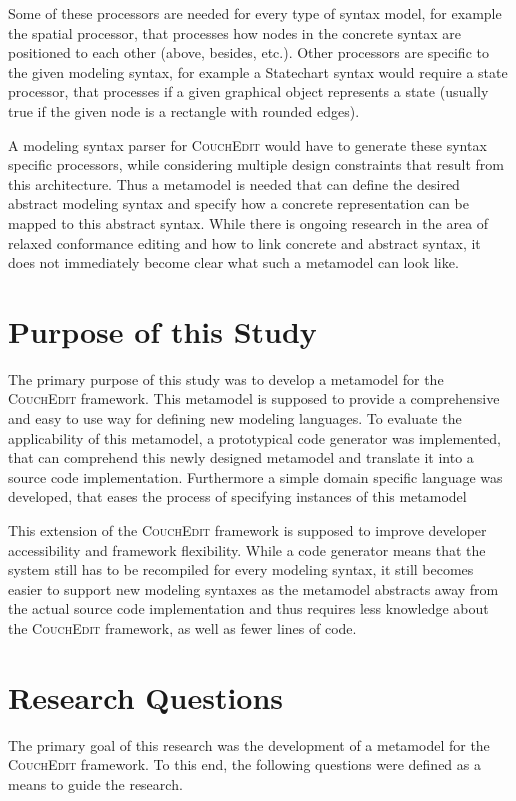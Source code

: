 Some of these processors are needed for every type of syntax model, for example the spatial processor, that processes how nodes in the concrete syntax are positioned to each other (above, besides, etc.). Other processors are specific to the given modeling syntax, for example a Statechart syntax would require a state processor, that processes if a given graphical object represents a state (usually true if the given node is a rectangle with rounded edges).

A modeling syntax parser for \textsc{CouchEdit} would have to generate these syntax specific processors, while considering multiple design constraints that result from this architecture. Thus a metamodel is needed that can define the desired abstract modeling syntax and specify how a concrete representation can be mapped to this abstract syntax. While there is ongoing research in the area of relaxed conformance editing and how to link concrete and abstract syntax, it does not immediately become clear what such a metamodel can look like.

\section{Purpose of this Study}
The primary purpose of this study was to develop a metamodel for the \textsc{CouchEdit} framework. This metamodel is supposed to provide a comprehensive and easy to use way for defining new modeling languages. To evaluate the applicability of this metamodel, a prototypical code generator was implemented, that can comprehend this newly designed metamodel and translate it into a source code implementation. Furthermore a simple domain specific language was developed, that eases the process of specifying instances of this metamodel

This extension of the \textsc{CouchEdit} framework is supposed to improve developer accessibility and framework flexibility. While a code generator means that the system still has to be recompiled for every modeling syntax, it still becomes easier to support new modeling syntaxes as the metamodel abstracts away from the actual source code implementation and thus requires less knowledge about the \textsc{CouchEdit} framework, as well as fewer lines of code.


\section{Research Questions}
The primary goal of this research was the development of a metamodel for the \textsc{CouchEdit} framework. To this end, the following questions were defined as a means to guide the research.


